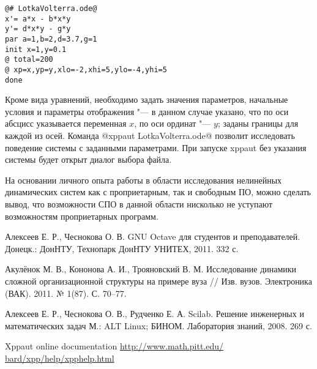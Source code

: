 \documentclass[10pt, a5paper]{article}
\begin{document}
\begin{verbatim}
@# LotkaVolterra.ode@
x'= a*x - b*x*y
y'= d*x*y - g*y
par a=1,b=2,d=3.7,g=1
init x=1,y=0.1
@ total=200
@ xp=x,yp=y,xlo=-2,xhi=5,ylo=-4,yhi=5
done
\end{verbatim}

Кроме вида уравнений, необходимо задать значения параметров, начальные условия и параметры отображения "--- в данном случае указано, что по оси абсцисс указывается переменная $x$, по оси ординат "--- $y$; заданы границы для каждой из осей. Команда @xppaut LotkaVolterra.ode@ позволит исследовать поведение системы с заданными параметрами.
При запуске xppaut без указания системы будет открыт диалог выбора файла.

На основании личного опыта работы в области исследования нелинейных динамических систем как с проприетарным, так и свободным ПО, можно сделать вывод, что возможности СПО в данной области нисколько не уступают возможностям проприетарных программ.


\begin{thebibliography}{9}

 Алексеев Е. Р., Чеснокова О. В. GNU Octave для студентов и преподавателей. Донецк.: ДонНТУ, Технопарк ДонНТУ УНИТЕХ, 2011. 332 с.

 Акулёнок М. В., Кононова А. И., Трояновский В. М. Исследование динамики сложной организационной структуры на примере вуза // Изв. вузов. Электроника (ВАК). 2011. № 1(87). С. 70–77.

 Алексеев Е. Р., Чеснокова О. В., Рудченко Е. А. Scilab. Решение инженерных и математических задач М.: ALT Linux; БИНОМ. Лаборатория знаний, 2008. 269 с.

 Xppaut online documentation  \url{http://www.math.pitt.edu/ bard/xpp/help/xpphelp.html}

\end{thebibliography}
\end{document}
